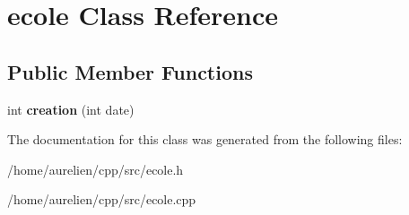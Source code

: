 \hypertarget{classecole}{}\section{ecole Class Reference}
\label{classecole}
\subsection*{Public Member Functions}
\begin{DoxyCompactItemize}
\item 
\mbox{\label{classecole_a781169dc2b4a85734b1217745515b55b}} 
int {\bfseries creation} (int date)
\end{DoxyCompactItemize}


The documentation for this class was generated from the following files\+:\begin{DoxyCompactItemize}
\item 
/home/aurelien/cpp/src/ecole.\+h\item 
/home/aurelien/cpp/src/ecole.\+cpp\end{DoxyCompactItemize}
